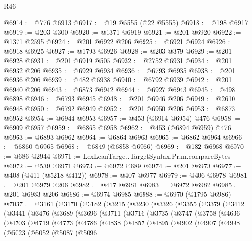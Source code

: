 \begin{lexlean}{R46}
\begin{coremodule}
@6914 := @776 @6913
@6917 := @19 @5555 (@22 @5555)
@6918 := @198 @6917
@6919 := @203 @300
@6920 := @1371 @6919
@6921 := @201 @6920
@6922 := @1371 @2595
@6924 := @201 @6922 @206
@6925 := @6921 @6924
@6926 := @6918 @6925
@6927 := @1793 @6926
@6928 := @203 @379
@6929 := @201 @6928
@6931 := @201 @6919 @505
@6932 := @2752 @6931
@6934 := @201 @6932 @206
@6935 := @6929 @6934
@6936 := @6793 @6935
@6938 := @201 @6936 @206
@6939 := @482 @6938
@6940 := @6792 @6939
@6942 := @201 @6940 @206
@6943 := @6873 @6942
@6944 := @6927 @6943
@6945 := @498 @6898
@6946 := @6793 @6945
@6948 := @201 @6946 @206
@6949 := @2610 @6948
@6950 := @6792 @6949
@6952 := @201 @6950 @206
@6953 := @6873 @6952
@6954 := @6944 @6953
@6957 := @453 (@6914 @6954) @476
@6958 := @6909 @6957
@6959 := @6865 @6958
@6962 := @453 (@6894 @6959) @476
@6963 := @6893 @6962
@6964 := @6864 @6963
@6965 := @6862 @6964
@6966 := @6860 @6965
@6968 := @6849 (@6858 @6966)
@6969 := @182 @6968
@6970 := @686 @2944
@6971 := LexLeanTarget.TargetSyntax.Prim.compareBytes
@6972 := @539 @6971
@6973 := @6972 @689
@6974 := @201 @6973
@6977 := @408 (@411 (@5218 @412))
@6978 := @407 @6977
@6979 := @406 @6978
@6981 := @201 @6979 @206
@6982 := @417 @6981
@6983 := @6972 @6982
@6985 := @201 @6983 @206
@6986 := @6974 @6985
@6988 := @6970 (@1795 @6986)
@7037 := @3161
    (@3170
      (@3182
        (@3215
          (@3230
            (@3326
              (@3355
                (@3379
                  (@3412
                    (@3441
                      (@3476
                        (@3689
                          (@3696
                            (@3711
                              (@3716
                                (@3735
                                  (@3747
                                    (@3758
                                      (@4636
                                        (@4703
                                          (@4719
                                            (@4773
                                              (@4786
                                                (@4838
                                                  (@4857
                                                    (@4895
                                                      (@4902
                                                        (@4907
                                                          (@4998
                                                            (@5023
                                                              (@5052
                                                                (@5087
                                                                  (@5096

\end{coremodule}
\end{lexlean}
